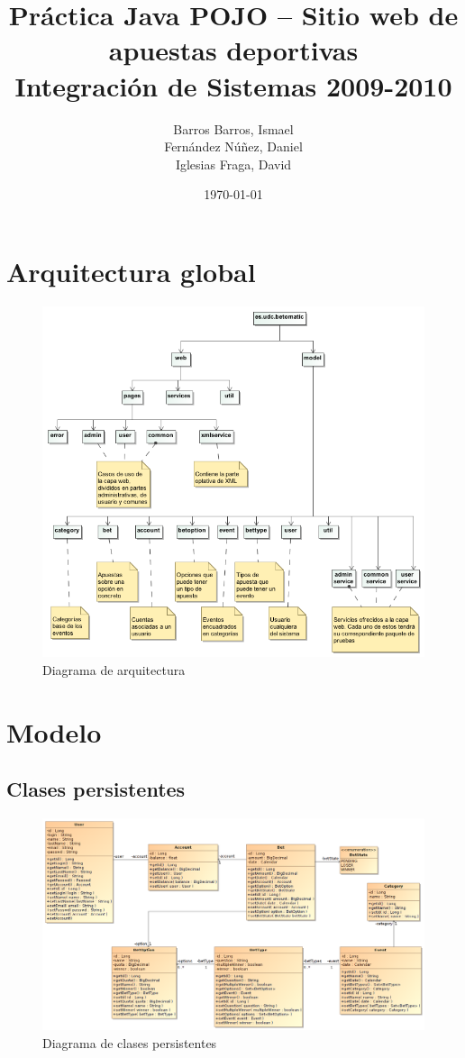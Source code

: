 \documentclass[a4paper,twoside]{article}
\author{Barros Barros, Ismael \\
  Fernández Núñez, Daniel \\
  Iglesias Fraga, David}
\date{\today}
\title{Práctica Java POJO -- Sitio web de apuestas deportivas \\ Integración de Sistemas 2009-2010}
\begin{document}
\maketitle
\cleardoublepage
\tableofcontents
\cleardoublepage

\section{Arquitectura global}


\begin{figure}[H]
  \centering
  \caption{Diagrama de arquitectura}
  \includegraphics[width=\textwidth]{../uml/Diagramas_it2_imgs/Free_Form_Diagram__Arquitectura.png}
\end{figure}


\newpage
\section{Modelo}


\subsection{Clases persistentes}

\begin{figure}[H]
  \centering
  \caption{Diagrama de clases persistentes}
  \includegraphics[width=.85\textheight,angle=90]{../uml/Class_Diagram__Clases_persistentes.png}
\end{figure}
\end{document}
